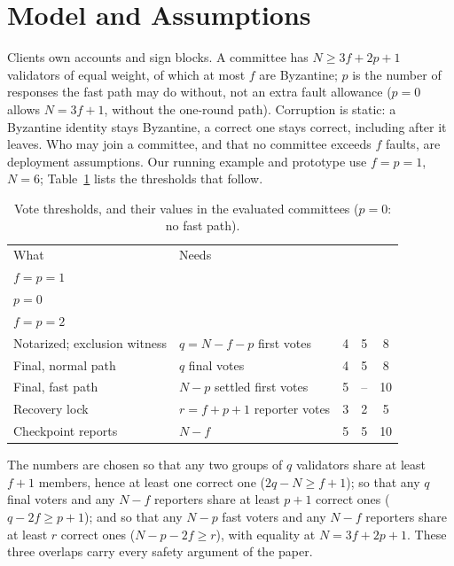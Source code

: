 \section{Model and Assumptions}
\label{sec:model}
Clients own accounts and sign blocks. A committee has $N\ge3f+2p+1$ validators of equal weight, of which at most $f$ are Byzantine; $p$ is the number of responses the fast path may do without, not an extra fault allowance ($p=0$ allows $N=3f+1$, without the one-round path). Corruption is static: a Byzantine identity stays Byzantine, a correct one stays correct, including after it leaves. Who may join a committee, and that no committee exceeds $f$ faults, are deployment assumptions. Our running example and prototype use $f=p=1$, $N=6$; Table~\ref{tab:thresholds} lists the thresholds that follow.

\begin{table}[t]
\caption{Vote thresholds, and their values in the evaluated committees ($p=0$: no fast path).}
\label{tab:thresholds}
\centering\footnotesize
\setlength{\tabcolsep}{3pt}
\begin{tabularx}{\columnwidth}{@{}>{\raggedright\arraybackslash}Xlccc@{}}
\toprule
What & Needs & \shortstack{$N{=}6$\\$f{=}p{=}1$} & \shortstack{$N{=}6$\\$p{=}0$} & \shortstack{$N{=}12$\\$f{=}p{=}2$}\\
\midrule
Notarized; exclusion witness & $q{=}N{-}f{-}p$ first votes & 4 & 5 & 8\\
Final, normal path & $q$ final votes & 4 & 5 & 8\\
Final, fast path & $N{-}p$ settled first votes & 5 & -- & 10\\
Recovery lock & $r{=}f{+}p{+}1$ reporter votes & 3 & 2 & 5\\
Checkpoint reports & $N{-}f$ & 5 & 5 & 10\\
\bottomrule
\end{tabularx}
\end{table}

The numbers are chosen so that any two groups of $q$ validators share at least $f+1$ members, hence at least one correct one ($2q-N\ge f+1$); so that any $q$ final voters and any $N-f$ reporters share at least $p+1$ correct ones ($q-2f\ge p+1$); and so that any $N-p$ fast voters and any $N-f$ reporters share at least $r$ correct ones ($N-p-2f\ge r$), with equality at $N=3f+2p+1$. These three overlaps carry every safety argument of the paper.

